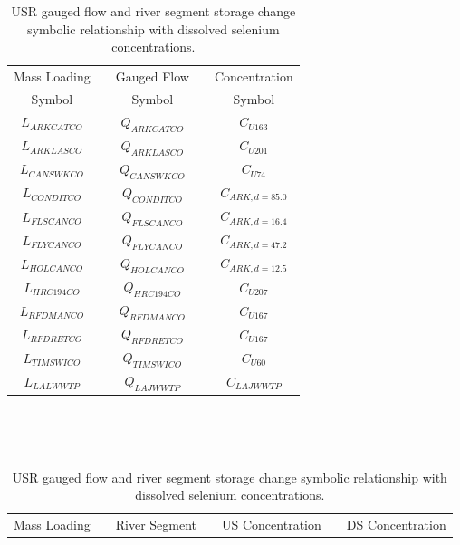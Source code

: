 \begin{table}[htbp]
	\centering
	\caption[USR gauged flow and river segment storage change symbolic relationship with dissolved selenium concentrations. ]{USR gauged flow and river segment storage change symbolic relationship with dissolved selenium concentrations.}
	\label{tab:concFlowStoreRelationship_USR}
	\begin{subtable}{\textwidth}
		\centering
		\begin{tabular}{c c c c c} 
			\toprule  
			Mass Loading & & Gauged Flow & & Concentration \\
			Symbol & & Symbol & & Symbol\\
			\toprule 
			$ L_{ARKCATCO} $ & & $ Q_{ARKCATCO} $ & & $ C_{U163} $\\
			$ L_{ARKLASCO} $ & & $ Q_{ARKLASCO} $ & & $ C_{U201} $\\
			$ L_{CANSWKCO} $ & & $ Q_{CANSWKCO} $ & & $ C_{U74} $\\
			$ L_{CONDITCO} $ & & $ Q_{CONDITCO} $ & & $ C_{ARK,d=85.0} $\\
			$ L_{FLSCANCO} $ & & $ Q_{FLSCANCO} $ & & $ C_{ARK,d=16.4} $\\
			$ L_{FLYCANCO} $ & & $ Q_{FLYCANCO} $ & & $ C_{ARK,d=47.2} $\\
			$ L_{HOLCANCO} $ & & $ Q_{HOLCANCO} $ & & $ C_{ARK,d=12.5} $\\
			$ L_{HRC194CO} $ & & $ Q_{HRC194CO} $ & & $ C_{U207} $\\
			$ L_{RFDMANCO} $ & & $ Q_{RFDMANCO} $ & & $ C_{U167} $\\
			$ L_{RFDRETCO} $ & & $ Q_{RFDRETCO} $ & & $ C_{U167} $\\
			$ L_{TIMSWICO} $ & & $ Q_{TIMSWICO} $ & & $ C_{U60} $\\
			$ L_{LALWWTP} $ & & $ Q_{LAJWWTP} $ & & $ C_{LAJWWTP} $\\
			\bottomrule
		\end{tabular} \\
	\end{subtable}\\
	\tablevspace
	\begin{subtable}{\textwidth}
		\centering
		\begin{tabular}{c c c c c c c} 
			\toprule  
			Mass Loading & & River Segment & & US Concentration & & DS Concentration\\

\end{tabular}
\end{subtable}
\end{table}
